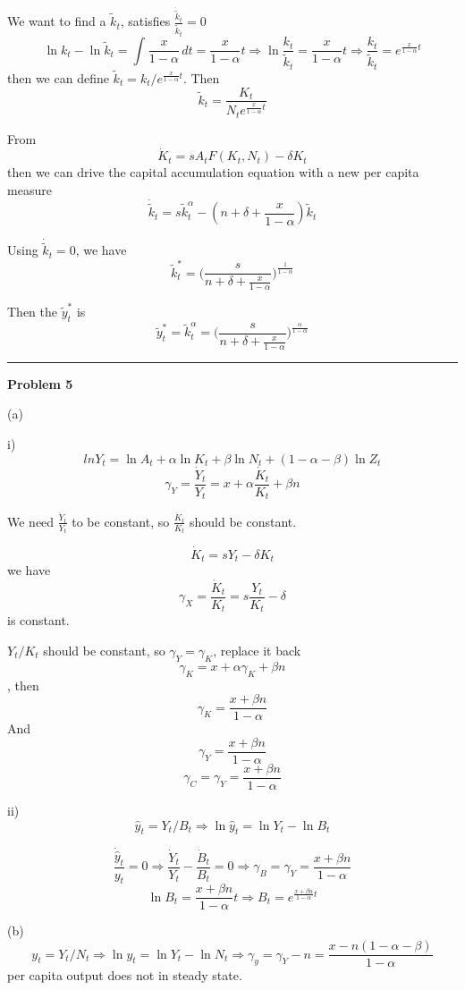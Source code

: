 \documentclass[letterpaper, 11pt]{article}
\newcommand{\1}{\mathds{1}}	%
\theoremstyle{definition}
\begin{document}
We want to find a $\tilde{k}_t$, satisfies $\frac{\dot{\tilde{k}}_t}{\tilde{k}_t} = 0$ \[
  \ln k_t - \ln \tilde{k}_t = \int_{}^{} \frac{x}{1-\alpha} \, dt = {\frac{x}{1-\alpha}t} \Longrightarrow \ln \frac{k_t}{\tilde{k}_t} = {\frac{x}{1-\alpha}t} \Longrightarrow \frac{k_t}{\tilde{k}_t} = e^{\frac{x}{1-\alpha}t}
\]
then we can define $\tilde{k}_t = {k_t}/{e^{\frac{x}{1-\alpha}t}}$. Then \[
  \tilde{k}_t = \frac{K_t}{N_t e^{\frac{x}{1-\alpha}t}}
\]

From \[
  \dot{K}_t = sA_tF(K_t,N_t) - \delta K_t
\] then we can drive the capital accumulation equation with a new per capita measure \[
  \dot{\tilde{k}}_t =  s \tilde{k}_t^\alpha - (n + \delta + \frac{x}{1-\alpha})\tilde{k}_t
\]

Using $\dot{\tilde{k}}_t  = 0$, we have \[
  \tilde{k}_t^* = \Big(\frac{s}{n + \delta + \frac{x}{1-\alpha}}\Big)^{\frac{1}{1-\alpha}}
\]

Then the $\tilde{y}_t^*$ is \[
  \tilde{y}_t^* = \tilde{k}_t^{\alpha} = \Big(\frac{s}{n + \delta + \frac{x}{1-\alpha}}\Big)^{\frac{\alpha}{1-\alpha}}
\]

\bigskip
\hrule
\bigskip

\textbf{Problem 5}

(a)

i)
\[
  ln Y_t = \ln A_t + \alpha\ln K_t + \beta \ln N_t + (1-\alpha-\beta)\ln Z_t
\]
\[
  \gamma_Y = \frac{\dot{Y}_t}{Y_t} = x + \alpha \frac{\dot{K}_t}{K_t} + \beta n
\]

We need $\frac{\dot{Y}_t}{Y_t}$ to be constant, so $\frac{\dot{K}_t}{K_t}$ should be constant.

\[
  \dot{K}_t = s Y_t - \delta K_t
\] we have \[
  \gamma_X = \frac{\dot{K}_t}{K_t} = s \frac{Y_t}{K_t} - \delta
\] is constant.

$Y_t/K_t$ should be constant, so $\gamma_Y = \gamma_K$, replace it back \[
  \gamma_K = x + \alpha \gamma_K + \beta n
\] , then \[
  \gamma_K = \frac{x+\beta n}{1-\alpha}
\]
And \[
  \gamma_Y =  \frac{x+\beta n}{1-\alpha}
\]
\[
  \gamma_C = \gamma_Y =  \frac{x+\beta n}{1-\alpha}
\]


ii)
\[
  \hat{y}_t = Y_t/B_t \Longrightarrow \ln \hat{y}_t = \ln Y_t - \ln B_t
\]

\[
  \frac{\dot{\hat{y}}_t}{y_t} = 0 \Longrightarrow  \frac{\dot{Y}_t}{Y_t} - \frac{\dot{B}_t}{B_t} = 0 \Longrightarrow \gamma_B = \gamma_Y = \frac{x + \beta n}{1-\alpha}
\]
\[
  \ln B_t = \frac{x + \beta n}{1-\alpha} t \Longrightarrow B_t = e^{\frac{x + \beta n}{1-\alpha}t}
\]

(b)
\[
  y_t = Y_t/N_t \Longrightarrow \ln y_t = \ln Y_t - \ln N_t \Longrightarrow \gamma_y = \gamma_Y - n = \frac{x - n(1-\alpha-\beta)}{1-\alpha}
\]
per capita output does not in steady state.
\end{document}
